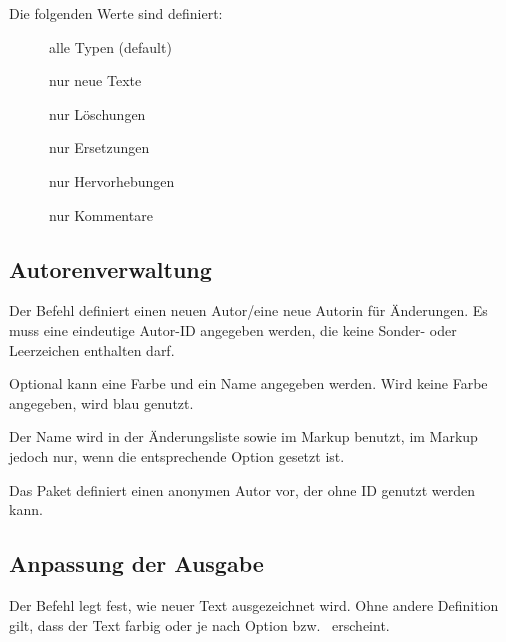 Die folgenden Werte sind definiert:

\begin{description}
	\item[] alle Typen (default)
	\item[] nur neue Texte
	\item[] nur Löschungen
	\item[] nur Ersetzungen
	\item[] nur Hervorhebungen
	\item[] nur Kommentare
\end{description}





\subsection{Autorenverwaltung}
\label{sec:ui:authormanagement}



Der Befehl  definiert einen neuen Autor/eine neue Autorin für Änderungen.
Es muss eine eindeutige Autor-ID angegeben werden, die keine Sonder- oder Leerzeichen enthalten darf.

Optional kann eine Farbe und ein Name angegeben werden.
Wird keine Farbe angegeben, wird blau genutzt.

Der Name wird in der Änderungsliste sowie im Markup benutzt, im Markup jedoch nur, wenn die entsprechende Option gesetzt ist.

Das Paket definiert einen anonymen Autor vor, der ohne ID genutzt werden kann.



\subsection{Anpassung der Ausgabe}
\label{sec:ui:customizingoutput}

\localtableofcontents



Der Befehl  legt fest, wie neuer Text ausgezeichnet wird.
Ohne andere Definition gilt, dass der Text farbig oder je nach Option  bzw.\  erscheint.

